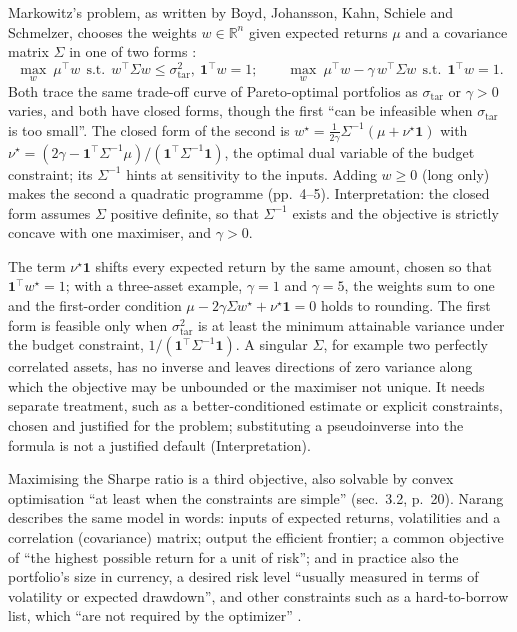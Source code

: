 \begin{qfmodel}\label{mod:mean-variance-portfolio-optimisation}
 Markowitz's problem, as written by Boyd, Johansson, Kahn, Schiele and Schmelzer, chooses the weights $w\in\mathbb R^n$ given expected returns $\mu$ and a covariance matrix $\Sigma$ in one of two forms \citep[author version of 5 Jan.\ 2024, sec.~1.1, eqs.~(1)--(2), pp.~4--5]{wide-boyd-markowitz-seventy}:
\[ \max_w\ \mu^\top w\ \ \text{s.t.}\ \ w^\top\Sigma w\le\sigma_{\mathrm{tar}}^2,\ \mathbf 1^\top w=1;\qquad \max_w\ \mu^\top w-\gamma\,w^\top\Sigma w\ \ \text{s.t.}\ \ \mathbf 1^\top w=1. \]
Both trace the same trade-off curve of Pareto-optimal portfolios as $\sigma_{\mathrm{tar}}$ or $\gamma>0$ varies, and both have closed forms, though the first ``can be infeasible when $\sigma_{\mathrm{tar}}$ is too small''. The closed form of the second is $w^\star=\tfrac1{2\gamma}\Sigma^{-1}(\mu+\nu^\star\mathbf 1)$ with $\nu^\star=(2\gamma-\mathbf 1^\top\Sigma^{-1}\mu)/(\mathbf 1^\top\Sigma^{-1}\mathbf 1)$, the optimal dual variable of the budget constraint; its $\Sigma^{-1}$ hints at sensitivity to the inputs. Adding $w\ge0$ (long only) makes the second a quadratic programme (pp.~4--5). Interpretation: the closed form assumes $\Sigma$ positive definite, so that $\Sigma^{-1}$ exists and the objective is strictly concave with one maximiser, and $\gamma>0$.

The term $\nu^\star\mathbf 1$ shifts every expected return by the same amount, chosen so that $\mathbf 1^\top w^\star=1$; with a three-asset example, $\gamma=1$ and $\gamma=5$, the weights sum to one and the first-order condition $\mu-2\gamma\Sigma w^\star+\nu^\star\mathbf 1=0$ holds to rounding. The first form is feasible only when $\sigma_{\mathrm{tar}}^2$ is at least the minimum attainable variance under the budget constraint, $1/(\mathbf 1^\top\Sigma^{-1}\mathbf 1)$. A singular $\Sigma$, for example two perfectly correlated assets, has no inverse and leaves directions of zero variance along which the objective may be unbounded or the maximiser not unique. It needs separate treatment, such as a better-conditioned estimate or explicit constraints, chosen and justified for the problem; substituting a pseudoinverse into the formula is not a justified default (Interpretation).

Maximising the Sharpe ratio is a third objective, also solvable by convex optimisation ``at least when the constraints are simple'' (sec.~3.2, p.~20). Narang describes the same model in words: inputs of expected returns, volatilities and a correlation (covariance) matrix; output the efficient frontier; a common objective of ``the highest possible return for a unit of risk''; and in practice also the portfolio's size in currency, a desired risk level ``usually measured in terms of volatility or expected drawdown'', and other constraints such as a hard-to-borrow list, which ``are not required by the optimizer'' \citep[chap.~6, sec.~6.2, pp.~104--106]{s7-narang}.


\end{qfmodel}
